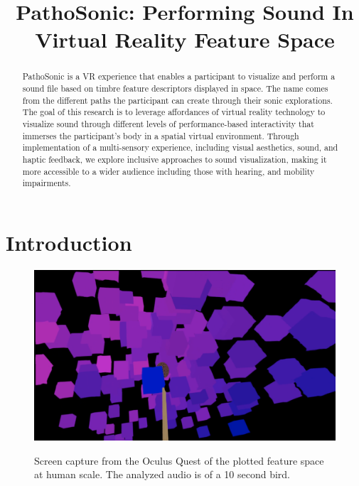 \documentclass{nime-alternate}
\begin{document}
\title{PathoSonic: Performing Sound In Virtual Reality Feature Space}

\maketitle

\begin{abstract}

PathoSonic is a VR experience that enables a participant to visualize and perform a sound file based on timbre feature descriptors displayed in space. The name comes from the different paths the participant can create through their sonic explorations. The goal of this research is to leverage affordances of virtual reality technology to visualize sound through different levels of performance-based interactivity that immerses the participant's body in a spatial virtual environment. Through implementation of a multi-sensory experience, including visual aesthetics, sound, and haptic feedback, we explore inclusive approaches to sound visualization, making it more accessible to a wider audience including those with hearing, and mobility impairments. 

\end{abstract}

\section{Introduction}


\begin{figure}[htbp]
       \centering
              \includegraphics[width=1\textwidth]{pathosonic8.jpg}
       \label{Screen capture from the Oculus Quest of the plotted feature space at human scale. The analyzed audio is of a 10 second bird.}
       \caption{Screen capture from the Oculus Quest of the plotted feature space at human scale. The analyzed audio is of a 10 second bird.}
\end{figure}
\end{document}
